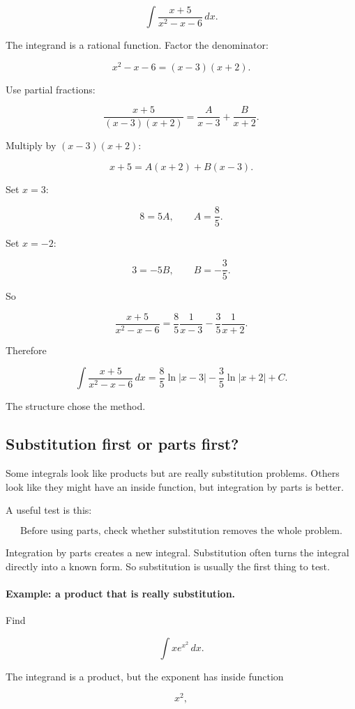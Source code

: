 \[
\int \frac{x+5}{x^2-x-6}\,dx.
\]

The integrand is a rational function.  Factor the denominator:

\[
x^2-x-6=(x-3)(x+2).
\]

Use partial fractions:

\[
\frac{x+5}{(x-3)(x+2)}
=
\frac{A}{x-3}+\frac{B}{x+2}.
\]

Multiply by \((x-3)(x+2)\):

\[
x+5=A(x+2)+B(x-3).
\]

Set \(x=3\):

\[
8=5A,
\qquad
A=\frac85.
\]

Set \(x=-2\):

\[
3=-5B,
\qquad
B=-\frac35.
\]

So

\[
\frac{x+5}{x^2-x-6}
=
\frac{8}{5}\frac{1}{x-3}
-
\frac{3}{5}\frac{1}{x+2}.
\]

Therefore

\[
\boxed{
\int \frac{x+5}{x^2-x-6}\,dx
=
\frac85\ln|x-3|-\frac35\ln|x+2|+C.
}
\]

The structure chose the method.

\subsection{Substitution first or parts first?}
\label{subsec:substitution-first-or-parts-first}

Some integrals look like products but are really substitution problems.  Others look like
they might have an inside function, but integration by parts is better.

A useful test is this:

\[
\boxed{
\text{Before using parts, check whether substitution removes the whole problem.}
}
\]

Integration by parts creates a new integral.  Substitution often turns the integral directly
into a known form.  So substitution is usually the first thing to test.

\paragraph{Example: a product that is really substitution.}
Find

\[
\int x e^{x^2}\,dx.
\]

The integrand is a product, but the exponent has inside function

\[
x^2,
\]

